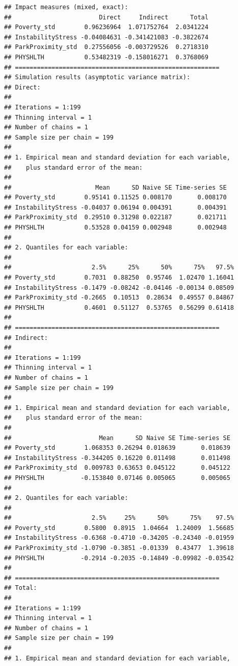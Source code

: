 \documentclass[
]{book}
\begin{document}
\begin{lstlisting}
## Impact measures (mixed, exact):
##                        Direct     Indirect      Total
## Poverty_std        0.96236964  1.071752764  2.0341224
## InstabilityStress -0.04084631 -0.341421083 -0.3822674
## ParkProximity_std  0.27556056 -0.003729526  0.2718310
## PHYSHLTH           0.53482319 -0.158016271  0.3768069
## ========================================================
## Simulation results (asymptotic variance matrix):
## Direct:
## 
## Iterations = 1:199
## Thinning interval = 1 
## Number of chains = 1 
## Sample size per chain = 199 
## 
## 1. Empirical mean and standard deviation for each variable,
##    plus standard error of the mean:
## 
##                       Mean      SD Naive SE Time-series SE
## Poverty_std        0.95141 0.11525 0.008170       0.008170
## InstabilityStress -0.04037 0.06194 0.004391       0.004391
## ParkProximity_std  0.29510 0.31298 0.022187       0.021711
## PHYSHLTH           0.53528 0.04159 0.002948       0.002948
## 
## 2. Quantiles for each variable:
## 
##                      2.5%      25%      50%      75%   97.5%
## Poverty_std        0.7031  0.88250  0.95746  1.02470 1.16041
## InstabilityStress -0.1479 -0.08242 -0.04146 -0.00134 0.08509
## ParkProximity_std -0.2665  0.10513  0.28634  0.49557 0.84867
## PHYSHLTH           0.4601  0.51127  0.53765  0.56299 0.61418
## 
## ========================================================
## Indirect:
## 
## Iterations = 1:199
## Thinning interval = 1 
## Number of chains = 1 
## Sample size per chain = 199 
## 
## 1. Empirical mean and standard deviation for each variable,
##    plus standard error of the mean:
## 
##                        Mean      SD Naive SE Time-series SE
## Poverty_std        1.068353 0.26294 0.018639       0.018639
## InstabilityStress -0.344205 0.16220 0.011498       0.011498
## ParkProximity_std  0.009783 0.63653 0.045122       0.045122
## PHYSHLTH          -0.153840 0.07146 0.005065       0.005065
## 
## 2. Quantiles for each variable:
## 
##                      2.5%     25%      50%      75%    97.5%
## Poverty_std        0.5800  0.8915  1.04664  1.24009  1.56685
## InstabilityStress -0.6368 -0.4710 -0.34205 -0.24340 -0.01959
## ParkProximity_std -1.0790 -0.3851 -0.01339  0.43477  1.39618
## PHYSHLTH          -0.2914 -0.2035 -0.14849 -0.09982 -0.03542
## 
## ========================================================
## Total:
## 
## Iterations = 1:199
## Thinning interval = 1 
## Number of chains = 1 
## Sample size per chain = 199 
## 
## 1. Empirical mean and standard deviation for each variable,

\end{lstlisting}
\end{document}
